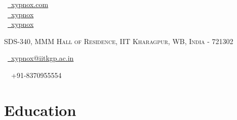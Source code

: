 \documentclass[a4paper,10pt]{extarticle} %
\begin{document}
\pagestyle{empty} %


\begin{multicols}{3}
\normalsize  \faGlobe\ {\href{http://xypnox.com/}{\  xypnox.com}}\\
\normalsize \faGithub\ {\href{https://github.com/xypnox}{\  xypnox}}\\
\normalsize  \faTwitter\ {\href{https://twitter.com/xypnox}{\  xypnox}}\\
\columnbreak
\normalsize\par{\par} %
\par{\centering\normalsize {\textsc{SDS-340, MMM Hall of Residence, IIT Kharagpur, WB, India - 721302}}\hfill\par}
\columnbreak
\raggedright\hfill\normalsize \faEnvelope\ {\href{mailto:xypnox@iitkgp.ac.in}{\  xypnox@iitkgp.ac.in}}\\
\raggedright\hfill{\faPhone\ \  +91-8370955554}
\end{multicols}

\vspace{1cm}



\section{\textcolor{primary}{Education}}
\end{document}
